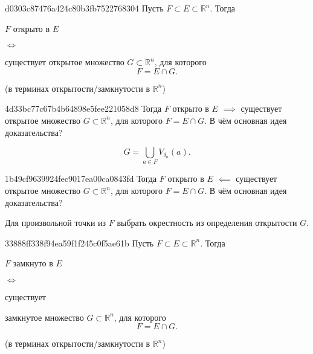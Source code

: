 \begin{note}{d0303c87476a424c80b3fb7522768304}
    Пусть \({ F \subset E \subset \mathbb R^{n} }\).
    Тогда \begin{icloze}{2}\({ F }\) открыто в \({ E }\)\end{icloze} \begin{icloze}{3}\({ \iff }\)\end{icloze}
    \begin{icloze}{1}
        существует открытое множество \({ G \subset \mathbb R^{n} }\), для которого
        \[
            F = E \cap G.
        \]
    \end{icloze}

    \begin{center}
        \tiny (в терминах открытости/замкнутости в \({ \mathbb R^{n} }\))
    \end{center}
\end{note}

\begin{note}{4d33bc77c67b4b64898e5fee221058d8}
    Тогда \({ F }\) открыто в \({ E }\) \({ \implies }\) существует открытое множество \({ G \subset \mathbb R^{n} }\), для которого \({ F = E \cap G }\).
    В чём основная идея доказательства?

    \begin{cloze}{1}
        \[
            G = \bigcup_{a \in F} V_{\delta_a}(a).
        \]
    \end{cloze}
\end{note}

\begin{note}{1b49cf9639924fec9017ea00ca0843fd}
    Тогда \({ F }\) открыто в \({ E }\) \({ \impliedby }\) существует открытое множество \({ G \subset \mathbb R^{n} }\), для которого \({ F = E \cap G }\).
    В чём основная идея доказательства?

    \begin{cloze}{1}
        Для произвольной точки из \({ F }\) выбрать окрестность из определения открытости \({ G }\).
    \end{cloze}
\end{note}

\begin{note}{33888ff338f94ea59f1f245c0f5ae61b}
    Пусть \({ F \subset E \subset \mathbb R^{n} }\).
    Тогда \begin{icloze}{2}\({ F }\) замкнуто в \({ E }\)\end{icloze} \begin{icloze}{3}\({ \iff }\)\end{icloze} существует
    \begin{icloze}{1}
        замкнутое множество \({ G \subset \mathbb R^{n} }\), для которого
        \[
            F = E \cap G.
        \]
    \end{icloze}

    \begin{center}
        \tiny (в терминах открытости/замкнутости в \({ \mathbb R^{n} }\))
    \end{center}
\end{note}

